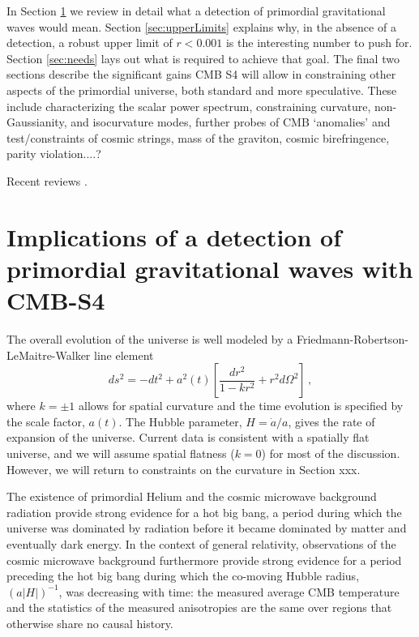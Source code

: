 In Section \ref{sec:detection} we review in detail what a detection of primordial gravitational waves would mean. Section \ref{sec:upperLimits} explains why, in the absence of a detection, a robust upper limit of $r<0.001$ is the interesting number to push for. Section \ref{sec:needs} lays out what is required to achieve that goal. The final two sections describe the significant gains CMB S4 will allow in constraining other aspects of the primordial universe, both standard and more speculative. These include characterizing the scalar power spectrum, constraining curvature, non-Gaussianity, and isocurvature modes, further probes of CMB `anomalies' and test/constraints of cosmic strings, mass of the graviton, cosmic birefringence, parity violation....?
 
Recent reviews \cite{Kamionkowski:2015yta}.

\section{Implications of a detection of primordial gravitational waves with CMB-S4}
\label{sec:detection}
The overall evolution of the universe is well modeled by a Friedmann-Robertson-LeMaitre-Walker line element
\begin{equation}
ds^2=-dt^2+a^2(t)\left[\frac{dr^2}{1-kr^2}+r^2d\Omega^2\right]\,,
\end{equation}
where $k=\pm1$ allows for spatial curvature and the time evolution is specified by the scale factor, $a(t)$. The Hubble parameter, $H=\dot{a}/a$, gives the rate of expansion of the universe. Current data is consistent with a spatially flat universe, and we will assume spatial flatness ($k=0$) for most of the discussion. However, we will return to constraints on the curvature in Section xxx.  

The existence of primordial Helium and the cosmic microwave background radiation provide strong evidence for a hot big bang, a period during which the universe was dominated by radiation before it became dominated by matter and eventually dark energy. In the context of general relativity, observations of the cosmic microwave background furthermore provide strong evidence for a period preceding the hot big bang during which the co-moving Hubble radius, $(a|H|)^{-1}$, was decreasing with time: the measured average CMB temperature and the statistics of the measured anisotropies are the same over regions that otherwise share no causal history. 


